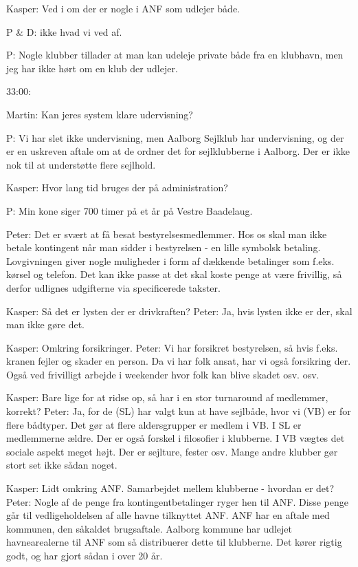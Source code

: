 Kasper: Ved i om der er nogle i ANF som udlejer både.

P \& D: ikke hvad vi ved af.

P: Nogle klubber tillader at man kan udeleje private både fra en klubhavn, men jeg har ikke hørt om en klub der udlejer.

33:00:


Martin: Kan jeres system klare udervisning?

P: Vi har slet ikke undervisning, men Aalborg Sejlklub har undervisning, og der er en uskreven aftale om at de ordner det for sejlklubberne i Aalborg. Der er ikke nok til at understøtte flere sejlhold.


Kasper: Hvor lang tid bruges der på administration?

P: Min kone siger 700 timer på et år på Vestre Baadelaug.


Peter: Det er svært at få besat bestyrelsesmedlemmer. Hos os skal man ikke betale kontingent når man sidder i bestyrelsen - en lille symbolsk betaling. Lovgivningen giver nogle muligheder i form af dækkende betalinger som f.eks. kørsel og telefon. Det kan ikke passe at det skal koste penge at være frivillig, så derfor udlignes udgifterne via specificerede takster.

Kasper: Så det er lysten der er drivkraften? Peter: Ja, hvis lysten ikke er der, skal man ikke gøre det.

Kasper: Omkring forsikringer. Peter: Vi har forsikret bestyrelsen, så hvis f.eks. kranen fejler og skader en person. Da vi har folk ansat, har vi også forsikring der. Også ved frivilligt arbejde i weekender hvor folk kan blive skadet osv. osv.

Kasper: Bare lige for at ridse op, så har i en stor turnaround af medlemmer, korrekt? Peter: Ja, for de (SL) har valgt kun at have sejlbåde, hvor vi (VB) er for flere bådtyper. Det gør at flere aldersgrupper er medlem i VB. I SL er medlemmerne ældre. Der er også forskel i filosofier i klubberne. I VB vægtes det sociale aspekt meget højt. Der er sejlture, fester osv. Mange andre klubber gør stort set ikke sådan noget.

Kasper: Lidt omkring ANF. Samarbejdet mellem klubberne - hvordan er det? Peter: Nogle af de penge fra kontingentbetalinger ryger hen til ANF. Disse penge går til vedligeholdelsen af alle havne tilknyttet ANF. ANF har en aftale med kommunen, den såkaldet brugsaftale. Aalborg kommune har udlejet havnearealerne til ANF som så distribuerer dette til klubberne. Det kører rigtig godt, og har gjort sådan i over 20 år.

